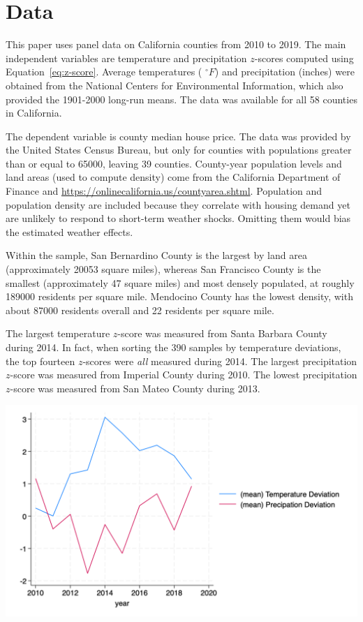 \documentclass[12pt,reqno]{amsart}
\theoremstyle{definition}
\begin{document}
\section{Data}\label{sec:Data}

    This paper uses panel data on California counties from 2010 to 2019. The main independent variables are temperature and precipitation $z$-scores computed using Equation~\ref{eq:z-score}. Average temperatures ( $^{\circ}F$) and precipitation (inches) were obtained from the National Centers for Environmental Information, which also provided the 1901-2000 long-run means. The data was available for all 58 counties in California.

    The dependent variable is county median house price. The data was provided by the United States Census Bureau, but only for counties with populations greater than or equal to 65000, leaving 39 counties. County-year population levels and land areas (used to compute density) come from the California Department of Finance and \url{https://onlinecalifornia.us/countyarea.shtml}. Population and population density are included because they correlate with housing demand yet are unlikely to respond to short-term weather shocks. Omitting them would bias the estimated weather effects.

    

    Within the sample, San Bernardino County is the largest by land area (approximately 20053 square miles), whereas San Francisco County is the smallest (approximately 47 square miles) and most densely populated, at roughly 189000 residents per square mile. Mendocino County has the lowest density, with about 87000 residents overall and 22 residents per square mile.

    The largest temperature $z$-score was measured from Santa Barbara County during 2014. In fact, when sorting the 390 samples by temperature deviations, the top fourteen $z$-scores were \textit{all} measured during 2014. The largest precipitation $z$-score was measured from Imperial County during 2010. The lowest precipitation $z$-score was measured from San Mateo County during 2013.

    \begin{table}
        \includegraphics[scale=0.6]{avg_precip_temp_dev_year.png}
    \end{table}
\end{document}
